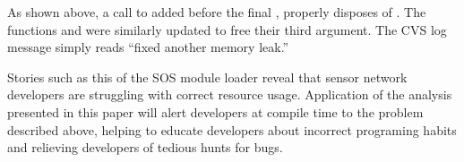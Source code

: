 As shown above, a call to  added before the final
, properly disposes of .
%
The functions  and  were
similarly updated to free their third argument.  
%
The CVS log message simply reads ``fixed another memory leak.''



Stories such as this of the SOS module loader reveal that sensor network
developers are struggling with correct resource usage.
%
Application of the analysis presented in this paper will alert developers at
compile time to the problem described above, helping to educate developers
about incorrect programing habits and relieving developers of tedious hunts
for bugs.


